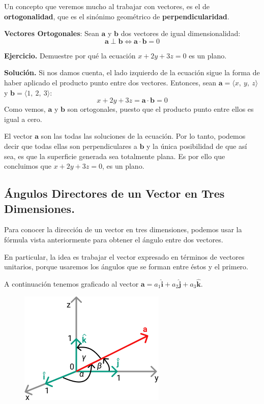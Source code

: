\documentclass[12pt]{article}
\begin{document}
Un concepto que veremos mucho al trabajar con vectores, es el de \textbf{ortogonalidad}, que es el sinónimo geométrico de \textbf{perpendicularidad}.

\textbf{Vectores Ortogonales}: Sean $\mathbf{a}$ y $\mathbf{b}$ dos vectores de igual dimensionalidad:
\[
  \mathbf{a} \perp \mathbf{b} \iff \mathbf{a} \cdot \mathbf{b} = 0
\]

\textbf{Ejercicio.} Demuestre por qué la ecuación $x + 2y + 3z = 0$ es un plano.

\textbf{Solución.} Si nos damos cuenta, el lado izquierdo de la ecuación sigue la forma de haber aplicado el producto punto entre dos vectores. Entonces, sean $\mathbf{a} = \langle x, \ y, \ z \rangle$ y $\mathbf{b} = \langle 1, \ 2, \ 3 \rangle$:
\[
  x + 2y + 3z = \mathbf{a} \cdot \mathbf{b} = 0
\]
Como vemos, $\mathbf{a}$ y $\mathbf{b}$ son ortogonales, puesto que el producto punto entre ellos es igual a cero.

El vector $\mathbf{a}$ son las todas las soluciones de la ecuación. Por lo tanto, podemos decir que todas ellas son perpendiculares a $\mathbf{b}$ y la única posibilidad de que así sea, es que la superficie generada sea totalmente plana. Es por ello que concluimos que $x + 2y + 3z = 0$, es un plano.


\subsection{Ángulos Directores de un Vector en Tres Dimensiones.}

Para conocer la dirección de un vector en tres dimensiones, podemos usar la fórmula vista anteriormente para obtener el ángulo entre dos vectores.

En particular, la idea es trabajar el vector expresado en términos de vectores unitarios, porque usaremos los ángulos que se forman entre éstos y el primero.

A continuación tenemos graficado al vector $\mathbf{a} = a_{1}\hat{\mathbf{i}} + a_{2}\hat{\mathbf{j}} + a_{3}\hat{\mathbf{k}}$.

\begin{figure}[hbt!]
\centering
\includegraphics[scale=0.7]{img/dir-angles-3d.jpg}
\end{figure}
\end{document}
